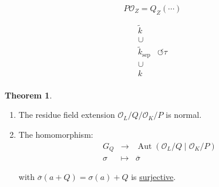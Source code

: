 \documentclass[openany]{amsbook}
\numberwithin{section}{chapter}
\theoremstyle{definition}
\newtheorem{theorem}{Theorem}[chapter]
\begin{document}
\[
    P \mathcal{O}_Z = Q_Z(\cdots)
\]

\[
    \begin{matrix}
        \tilde{k} &   \\
        \cup &   \\
        \tilde{k}_{\text{sep}} & \circlearrowleft \tau  \\
        \cup &   \\
        k &   \\
    \end{matrix}
\]

\begin{theorem}
    \begin{enumerate}[label=\arabic*)]
        \item The residue field extension \(\mathcal{O}_L / Q \big/ \mathcal{O}_K / P\) is normal. 
        \item The homomorphism:
        \[
            \begin{array}{rcl}
                G_Q & \to &  \operatorname{Aut}(\mathcal{O}_L / Q \mid \mathcal{O}_K / P)  \\
                \sigma  & \mapsto & \overline{\sigma }  
            \end{array}
        \]

        with \(\overline{\sigma} (a+Q) = \sigma (a) + Q\) is \underline{surjective}.

    \end{enumerate} 
\end{theorem}
\end{document}
